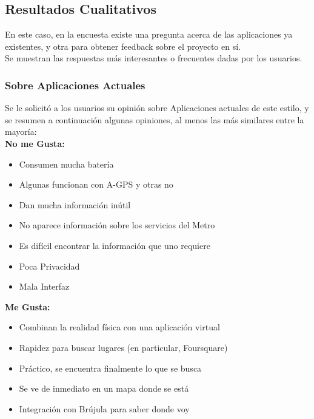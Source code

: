 \documentclass[10pt,letterpaper]{article}
\begin{document}

\subsection{Resultados Cualitativos}

En este caso, en la encuesta existe una pregunta acerca de las aplicaciones ya existentes, y otra para obtener feedback sobre el proyecto en sí.\\

Se muestran las respuestas más interesantes o frecuentes dadas por los usuarios.\\

\subsubsection{Sobre Aplicaciones Actuales}

Se le solicitó a los usuarios su opinión sobre Aplicaciones actuales de este estilo, y se resumen a continuación algunas opiniones, al menos las más similares entre la mayoría:\\

\textbf{No me Gusta:}\\

\begin{itemize}
\item Consumen mucha batería
\item Algunas funcionan con A-GPS y otras no
\item Dan mucha información inútil
\item No aparece información sobre los servicios del Metro
\item Es difícil encontrar la información que uno requiere
\item Poca Privacidad
\item Mala Interfaz
\end{itemize}

\textbf{Me Gusta:}\\

\begin{itemize}
\item Combinan la realidad física con una aplicación virtual
\item Rapidez para buscar lugares (en particular, Foursquare)
\item Práctico, se encuentra finalmente lo que se busca
\item Se ve de inmediato en un mapa donde se está
\item Integración con Brújula para saber donde voy
\end{itemize}
\end{document}
